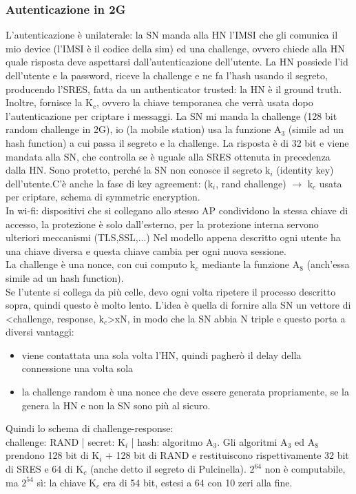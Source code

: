 \documentclass[16px]{article}
\begin{document}
\subsubsection{Autenticazione in 2G}
L'autenticazione è unilaterale: la SN manda alla HN l'IMSI che gli comunica il mio device (l'IMSI è il codice della sim) ed una challenge, ovvero chiede alla HN quale risposta deve aspettarsi dall'autenticazione dell'utente. La HN possiede l'id dell'utente e la password, riceve la challenge e ne fa l'hash usando il segreto, producendo l'SRES, fatta da un authenticator trusted: la HN è il ground truth.\\ Inoltre, fornisce la K$_{c}$, ovvero la chiave temporanea che verrà usata dopo l'autenticazione per criptare i messaggi. La SN mi manda la challenge (128 bit random challenge in 2G), io (la mobile station) usa la funzione A$_{3}$ (simile ad un hash function) a cui passa il segreto e la challenge. La risposta è di 32 bit e viene mandata alla SN, che controlla se è uguale alla SRES ottenuta in precedenza dalla HN. Sono protetto, perché la SN non conosce il segreto k$_{i}$ (identity key) dell'utente.C'è anche la fase di key agreement: (k$_{i}$, rand challenge) $\longrightarrow$ k$_{c}$ usata per criptare, schema di symmetric encryption.\\ In wi-fi: dispositivi che si collegano allo stesso AP condividono la stessa chiave di accesso, la protezione è solo dall'esterno, per la protezione interna servono ulteriori meccanismi (TLS,SSL,...) Nel modello appena descritto ogni utente ha una chiave diversa e questa chiave cambia per ogni nuova sessione.\\ La challenge è una nonce, con cui computo k$_{c}$ mediante la funzione A$_{8}$ (anch'essa simile ad un hash function).\\ Se l'utente si collega da più celle, devo ogni volta ripetere il processo descritto sopra, quindi questo è molto lento. L'idea è quella di fornire alla SN un vettore di <challenge, response, k$_{c}$>xN, in modo che la SN abbia N triple e questo porta a diversi vantaggi:
\begin{itemize}
\item viene contattata una sola volta l'HN, quindi pagherò il delay della connessione una volta sola
\item la challenge random è una nonce che deve essere generata propriamente, se la genera la HN e non la SN sono più al sicuro.
\end{itemize}
Quindi lo schema di challenge-response:\\
challenge: RAND | secret: K$_{i}$ | hash: algoritmo A$_{3}$.
Gli algoritmi A$_{3}$ ed A$_{8}$ prendono 128 bit di K$_{i}$ + 128 bit di RAND e restituiscono rispettivamente 32 bit di SRES e 64 di K$_{c}$ (anche detto il segreto di Pulcinella). $2^{64}$ non è computabile, ma $2^{54}$ sì: la chiave K$_{c}$ era di 54 bit, estesi a 64 con 10 zeri alla fine.
\end{document}
